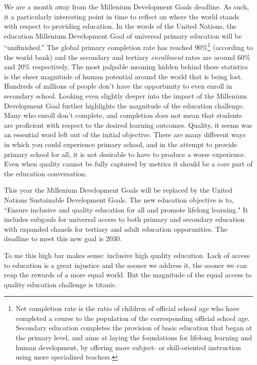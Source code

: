 We are a month away from the Millenium Development Goals deadline. As such, it a particularly interesting point in time to reflect on where the world stands with respect to providing education. In the words of the United Nations, the education Millenium Development Goal of universal primary education will be ``unifinished." The global primary completion rate has reached 90\%\footnote{Net completion rate is the ratio of children of official school age who have completed a course to the population of the corresponding official school age. Secondary education completes the provision of basic education that began at the primary level, and aims at laying the foundations for lifelong learning and human development, by offering more subject- or skill-oriented instruction using more specialized teachers.} (according to the world bank) and the secondary and tertiary \emph{enrollment} rates are around 60\% and 20\% respectively. The most palpable meaning hidden behind these statistics is the sheer magnitude of human potential around the world that is being lost. Hundreds of millions of people don't have the opportunity to even enroll in secondary school. Looking even slightly deeper into the impact of the Millenium Development Goal further highlights the magnitude of the education challenge. Many who enroll don't complete, and completion does not mean that students are proficient with respect to the desired learning outcomes. Quality, it seems was an essential word left out of the initial objective. There are many different ways in which you could experience primary school, and in the attempt to provide primary school for all, it is not desirable to have to produce a worse experience. Even when quality cannot be fully captured by metrics it should be a core part of the education conversation.

This year the Millenium Development Goals will be replaced by the United Nations Sustainable Development Goals. The new education objective is to, ``Ensure inclusive and quality education for all and promote lifelong learning." It includes subgoals for universal access to both primary and secondary education with expanded chanels for tertiary and adult education opporunities. The deadline to meet this new goal is 2030. 

To me this high bar makes sense: inclusive high quality education. Lack of access to education is a great injustice and the sooner we address it, the sooner we can reap the rewards of a more equal world. But the magnitude of the equal access to quality education challenge is titanic. 

